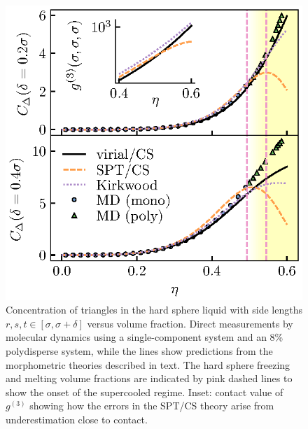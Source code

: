 \documentclass[11pt,twoside]{report}
\begin{document}
\begin{figure}
  \includegraphics[width=0.9\linewidth,outer]{sp3}
  \caption{Concentration of triangles in the hard sphere liquid with side lengths $r,s,t \in [\sigma, \sigma + \delta]$ versus volume fraction.
    Direct measurements by molecular dynamics using a single-component system and an 8\% polydisperse system, while the lines show predictions from the morphometric theories described in text.
    The hard sphere freezing and melting volume fractions are indicated by pink dashed lines to show the onset of the supercooled regime.
    Inset: contact value of $g^{(3)}$ showing how the errors in the SPT/CS theory arise from underestimation close to contact.}
  \label{fig:sp3}
\end{figure}
\end{document}

